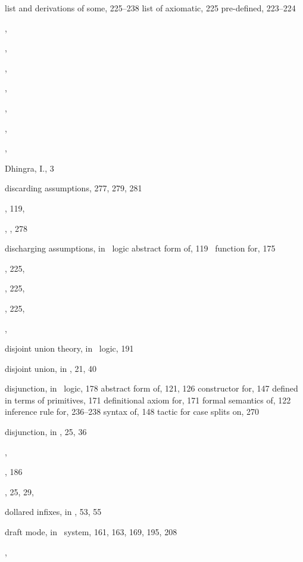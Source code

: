 \begin{theindex}
    \subitem list and derivations of some, 225--238
    \subitem list of axiomatic, 225
    \subitem pre-defined, 223--224
  \item {}, 
  \item {}, 
  \item {}, 
  \item {}, 
  \item {}, 
  \item {}, 
  \item {}, 
  \item Dhingra, I., 3
  \item discarding assumptions, 277, 279, 281
  \item {}, 119, 
  \item {}, , 278
  \item discharging assumptions, in \HOL\ logic
    \subitem abstract form of, 119
    \subitem \ML\ function for, 175
  \item {}, 225, 
  \item {}, 225, 
  \item {}, 225, 
  \item {}, 
  \item disjoint union theory, in \HOL\ logic, 191
  \item disjoint union, in \ML, 21, 40
  \item disjunction, in \HOL\ logic, 178
    \subitem abstract form of, 121, 126
    \subitem constructor for, 147
    \subitem defined in terms of primitives, 171
    \subitem definitional axiom for, 171
    \subitem formal semantics of, 122
    \subitem inference rule for, 236--238
    \subitem syntax of, 148
    \subitem tactic for case splits on, 270
  \item disjunction, in \ML, 25, 36
  \item {}, 
  \item {}, 186
  \item {}, 25, 29, 
  \item dollared infixes, in \ML, 53, 55
  \item draft mode, in \HOL\ system, 161, 163, 169, 195, 208
  \item {}, 

  \indexspace


\end{theindex}
